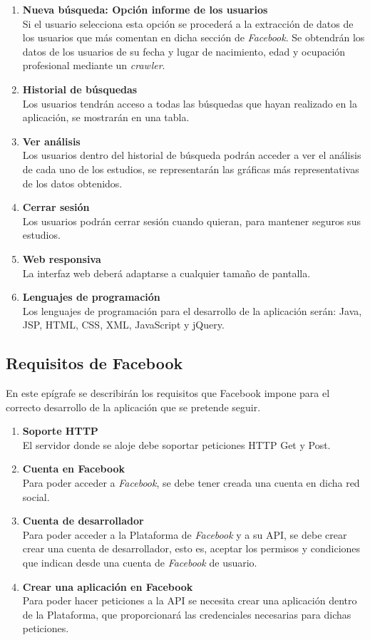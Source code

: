 \begin{enumerate}
\item \textbf{Nueva búsqueda: Opción informe de los usuarios} \\
Si el usuario selecciona esta opción se procederá a la extracción de datos de los usuarios que más comentan en dicha sección de \textit{Facebook}. Se obtendrán los datos de los usuarios de su fecha y lugar de nacimiento, edad y ocupación profesional mediante un \textit{crawler}.
\item \textbf{Historial de búsquedas} \\
Los usuarios tendrán acceso a todas las búsquedas que hayan realizado en la aplicación, se mostrarán en una tabla.
\item \textbf{Ver análisis} \\
Los usuarios dentro del historial de búsqueda podrán acceder a ver el análisis de cada uno de los estudios, se representarán las gráficas más representativas de los datos obtenidos. 
\item \textbf{Cerrar sesión} \\
Los usuarios podrán cerrar sesión cuando quieran, para mantener seguros sus estudios. 
\item \textbf{Web responsiva} \\
La interfaz web deberá adaptarse a cualquier tamaño de pantalla.
\item \textbf{Lenguajes de programación} \\
Los lenguajes de programación para el desarrollo de la aplicación serán: Java, JSP, HTML, CSS, XML, JavaScript y jQuery.
\end{enumerate}

\subsection{Requisitos de Facebook}
En este epígrafe se describirán los requisitos que Facebook impone para el correcto desarrollo de la aplicación que se pretende seguir. 
\begin{enumerate} \itemsep4pt \parskip0pt
\item \textbf{Soporte HTTP}\\
El servidor donde se aloje debe soportar peticiones HTTP Get y Post.
\item \textbf{Cuenta en Facebook} \\
Para poder acceder a \textit{Facebook}, se debe tener creada una cuenta en dicha red social.
\item \textbf{Cuenta de desarrollador} \\
Para poder acceder a la Plataforma de \textit{Facebook} y a su API, se debe crear crear una cuenta de desarrollador, esto es, aceptar los permisos y condiciones que indican desde una cuenta de \textit{Facebook} de usuario.
\item \textbf{Crear una aplicación en Facebook}\\
Para poder hacer peticiones a la API se necesita crear una aplicación dentro de la Plataforma, que proporcionará las credenciales necesarias para dichas peticiones.
\end{enumerate}

